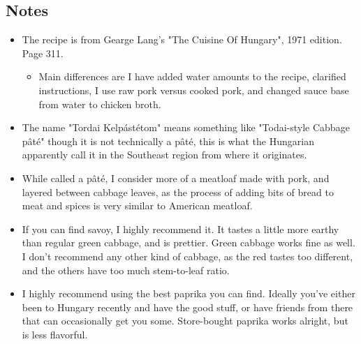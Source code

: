\begin{multicols}{2}
\begin{enumerate}
\end{enumerate}

\subsection*{Notes}
\begin{itemize}
    \item The recipe is from Gearge Lang's "The Cuisine Of Hungary", 1971 edition. Page 311.
    \begin{itemize}
        \item Main differences are I have added water amounts to the recipe, clarified instructions, I use raw pork versus cooked pork, and changed sauce base from water to chicken broth.
    \end{itemize}
    \item The name "Tordai Kelpástétom" means something like "Todai-style Cabbage pâté" though it is not technically a pâté, this is what the Hungarian apparently call it in the Southeast region from where it originates.
    \item While called a pâté, I consider more of a meatloaf made with pork, and layered between cabbage leaves, as the process of adding bits of bread to meat and spices is very similar to American meatloaf.
    \item If you can find savoy, I highly recommend it. It tastes a little more earthy than regular green cabbage, and is prettier. Green cabbage works fine as well. I don't recommend any other kind of cabbage, as the red tastes too different, and the others have too much stem-to-leaf ratio.
    \item I highly recommend using the best paprika you can find. Ideally you've either been to Hungary recently and have the good stuff, or have friends from there that can occasionally get you some. Store-bought paprika works alright, but is less flavorful.
\end{itemize}
\end{multicols}
\clearpage